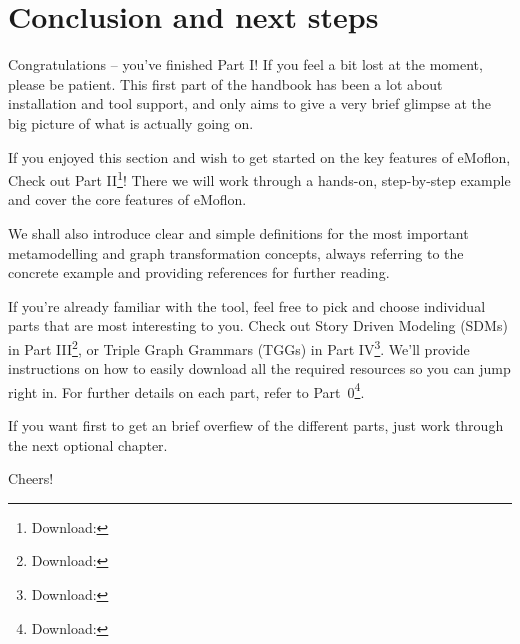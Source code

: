 \newpage
\hypertarget{conclusion}{} 
\section{Conclusion and next steps}
\genHeader

Congratulations -- you've finished Part I! If you feel a bit lost at the moment, please be patient. This first part of the handbook has been a lot about
installation and tool support, and only aims to give a very brief glimpse at the big picture of what is actually going on.

If you enjoyed this section and wish to get started on the key features of eMoflon, Check out Part II\footnote{Download: \dlPartTwo}! There we will work through a hands-on, step-by-step
example and cover the core features of eMoflon.

We shall also introduce clear and simple definitions for the most important metamodelling and graph transformation concepts, always referring to the concrete
example and providing references for further reading.

If you're already familiar with the tool, feel free to pick and choose individual parts that are most interesting to you. Check out Story Driven Modeling (SDMs)
in Part III\footnote{Download: \dlPartThree}, or Triple Graph Grammars (TGGs) in Part IV\footnote{Download: \dlPartFour}. We'll provide instructions on how to easily download all the required resources so you can jump
right in. For further details on each part, refer to Part~0\footnote{Download: \dlPartZero}.

If you want first to get an brief overfiew of the different parts, just work through the next optional chapter.

Cheers!